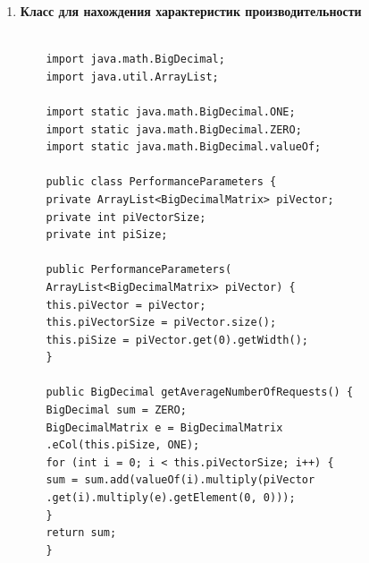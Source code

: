 \documentclass[12pt, a4paper]{article}
\begin{document}
\begin{enumerate}
\begin{verbatim}
	static {
	generators      = new HashMap<>();
	pSlashMatrices  = new HashMap<>();
	phiMatrices     = new HashMap<>();
	piVectors       = new HashMap<>();
	
	}
	
	private MatrixContainer() {
	}
	
	public static BigDecimalMatrix getG() {
	return g;
	}
	
	public static void setG(BigDecimalMatrix g) {
	MatrixContainer.g = g;
	}
	
	public static HashMap<Integer, 
	BigDecimalMatrix> getGenerators() {
	return generators;
	}
	
	public static HashMap<Integer, 
	BigDecimalMatrix> getPSlashMatrices() {
	return pSlashMatrices;
	}
	
	public static HashMap<Integer, 
	BigDecimalMatrix> getPhiMatrices() {
	return phiMatrices;
	}
	
	public static HashMap<Integer, 
	BigDecimalMatrix> getPiVectors() {
	return piVectors;
	}
	
	public static void reInit() {
	g               = null;
	generators      = new HashMap<>();
	pSlashMatrices  = new HashMap<>();
	phiMatrices     = new HashMap<>();
	piVectors       = new HashMap<>();
	}
	}
	\end{verbatim}
	\pagebreak
	\item \textbf{Класс для нахождения характеристик производительности}
	
	\begin{verbatim}
	
	import java.math.BigDecimal;
	import java.util.ArrayList;
	
	import static java.math.BigDecimal.ONE;
	import static java.math.BigDecimal.ZERO;
	import static java.math.BigDecimal.valueOf;
	
	public class PerformanceParameters {
	private ArrayList<BigDecimalMatrix> piVector;
	private int piVectorSize;
	private int piSize;
	
	public PerformanceParameters(
	ArrayList<BigDecimalMatrix> piVector) {
	this.piVector = piVector;
	this.piVectorSize = piVector.size();
	this.piSize = piVector.get(0).getWidth();
	}
	
	public BigDecimal getAverageNumberOfRequests() {
	BigDecimal sum = ZERO;
	BigDecimalMatrix e = BigDecimalMatrix
	.eCol(this.piSize, ONE);
	for (int i = 0; i < this.piVectorSize; i++) {
	sum = sum.add(valueOf(i).multiply(piVector
	.get(i).multiply(e).getElement(0, 0)));
	}
	return sum;
	}
	

\end{verbatim}
\end{enumerate}
\end{document}
